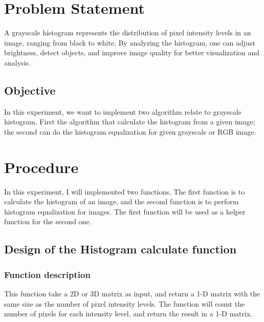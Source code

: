 \documentclass[a4paper,11pt]{article}
\begin{document}
\thispagestyle{empty}

\blankpage

\tableofcontents
\blankpage

\section{Problem Statement}
A grayscale histogram represents the distribution of pixel intensity levels in an image, ranging from black to white. By analyzing the histogram, one can adjust brightness, detect objects, and improve image quality for better visualization and analysis.
\\
\subsection{Objective}
    In this experiment, we want to implement two algorithm relate to grayscale histogram. First the algorithm that calculate the histogram from a given image; the second can do the histogram equalization for given grayscale or RGB image.\\

\section{Procedure}
In this experiment, I will implemented two functions. The first function is to calculate the histogram of an image, and the second function is to perform histogram equalization for images. The first function will be used as a helper function for the second one.\\

\subsection{Design of the Histogram calculate function}
\subsubsection{Function description}
This function take a 2D or 3D matrix as input, and return a 1-D matrix with the same size as the number of pixel intensity levels. The function will count the number of pixels for each intensity level, and return the result in a 1-D matrix.\\
\end{document}
